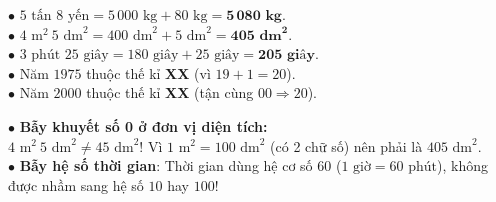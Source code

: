 \documentclass[14pt,a4paper,oneside]{extbook}
\begin{document}
\vspace{2mm}

\noindent
\begin{minipage}[t]{0.53\textwidth}
  \begin{tcolorbox}[
    enhanced,
    title={\footnotesize\bfseries\color{white}\faCheckCircle\ Ví dụ thực hành chuẩn mực},
    colback=green!2!white,
    colframe=green!60!black,
    arc=2.5mm, boxrule=0.8pt, top=1.8mm, bottom=1.8mm, left=2.2mm, right=2.2mm
  ]
    \footnotesize
    $\bullet$ $5\text{ tấn } 8\text{ yến} = 5\,000\text{ kg} + 80\text{ kg} = \mathbf{5\,080\text{ kg}}$.\\
    $\bullet$ $4\text{ m}^2\ 5\text{ dm}^2 = 400\text{ dm}^2 + 5\text{ dm}^2 = \mathbf{405\text{ dm}^2}$.\\
    $\bullet$ $3\text{ phút } 25\text{ giây} = 180\text{ giây} + 25\text{ giây} = \mathbf{205\text{ giây}}$.\\
    $\bullet$ Năm $1975$ thuộc thế kỉ \textbf{XX} (vì $19 + 1 = 20$).\\
    $\bullet$ Năm $2000$ thuộc thế kỉ \textbf{XX} (tận cùng $00 \Rightarrow 20$).
  \end{tcolorbox}
\end{minipage}%
\hfill
\begin{minipage}[t]{0.45\textwidth}
  \begin{tcolorbox}[
    enhanced,
    title={\footnotesize\bfseries\color{white}\faExclamationTriangle\ Mẹo tránh bẫy trắc nghiệm},
    colback=red!2!white,
    colframe=red!70!black,
    arc=2.5mm, boxrule=0.8pt, top=1.8mm, bottom=1.8mm, left=2.2mm, right=2.2mm
  ]
    \footnotesize
    $\bullet$ \textbf{Bẫy khuyết số 0 ở đơn vị diện tích:}\\
    $4\text{ m}^2\ 5\text{ dm}^2 \ne 45\text{ dm}^2$! Vì $1\text{ m}^2 = 100\text{ dm}^2$ (có 2 chữ số) nên phải là \textbf{$405\text{ dm}^2$}.\\
    $\bullet$ \textbf{Bẫy hệ số thời gian}: Thời gian dùng hệ cơ số $60$ ($1\text{ giờ} = 60\text{ phút}$), không được nhầm sang hệ số $10$ hay $100$!
  \end{tcolorbox}
\end{minipage}
\end{document}
